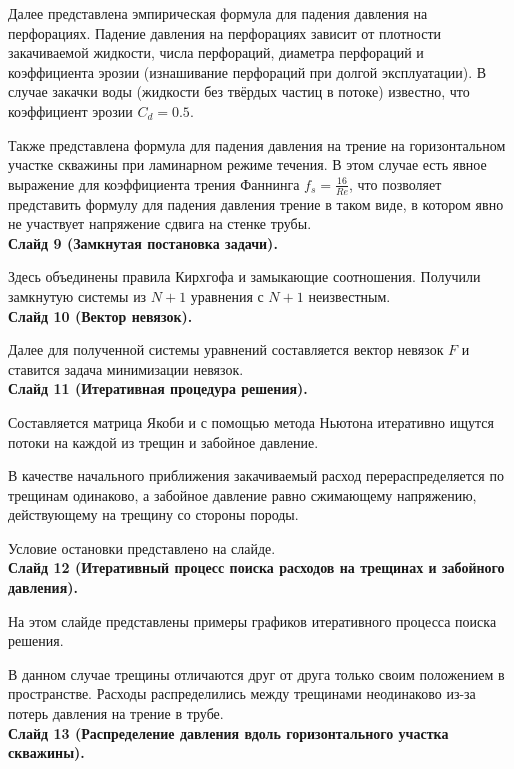 \documentclass[a4paper, 12pt]{article}
\begin{document}
Далее представлена эмпирическая формула для падения давления на перфорациях.
Падение давления на перфорациях зависит от плотности закачиваемой жидкости, числа перфораций, диаметра перфораций и коэффициента эрозии (изнашивание перфораций при долгой эксплуатации).
В случае закачки воды (жидкости без твёрдых частиц в потоке) известно, что коэффициент эрозии $C_d=0.5$.

Также представлена формула для падения давления на трение на горизонтальном участке скважины при ламинарном режиме течения.
В этом случае есть явное выражение для коэффициента трения Фаннинга $f_s=\frac{16}{Re}$, что позволяет представить формулу для падения давления трение в таком виде, в котором явно не участвует напряжение сдвига на стенке трубы.
\\


\textbf{Слайд 9 (Замкнутая постановка задачи).}

Здесь объединены правила Кирхгофа и замыкающие соотношения.
Получили замкнутую системы из $N+1$ уравнения с $N+1$ неизвестным.
\\


\textbf{Слайд 10 (Вектор невязок).}

Далее для полученной системы уравнений составляется вектор невязок $F$ и ставится задача минимизации невязок.
\\


\textbf{Слайд 11 (Итеративная процедура решения).}

Составляется матрица Якоби и с помощью метода Ньютона итеративно ищутся потоки на каждой из трещин и забойное давление.

В качестве начального приближения закачиваемый расход перераспределяется по трещинам одинаково, а забойное давление равно сжимающему напряжению, действующему на трещину со стороны породы.

Условие остановки представлено на слайде.
\\


\textbf{Слайд 12 (Итеративный процесс поиска расходов на трещинах и забойного давления).}

На этом слайде представлены примеры графиков итеративного процесса поиска решения.

В данном случае трещины отличаются друг от друга только своим положением в пространстве.
Расходы распределились между трещинами неодинаково из-за потерь давления на трение в трубе.
\\


\textbf{Слайд 13 (Распределение давления вдоль горизонтального участка скважины).}
\end{document}
